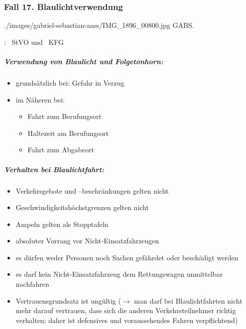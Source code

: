 \subsubsection{Fall 17. Blaulichtverwendung}

{}
{./images/gabriel-sebastian-aass/IMG_1896_00800.jpg}
{}
{GABS.}







: ~StVO und ~KFG

\subparagraph{Verwendung von Blaulicht und Folgetonhorn:}

\begin{itemize}
    \item grundsätzlich bei: Gefahr in Verzug
    \item im Näheren bei:
    \begin{itemize}
        \item Fahrt zum Berufungsort
        \item Haltezeit am Berufungsort
        \item Fahrt zum Abgabeort
    \end{itemize}
\end{itemize}

\subparagraph{Verhalten bei Blaulichtfahrt:}

\begin{itemize}
    \item Verkehrsgebote und --beschränkungen gelten nicht
    \item Geschwindigkeitshöchstgrenzen gelten nicht
    \item Ampeln gelten als Stopptafeln
    \item absoluter Vorrang vor Nicht-Einsatzfahrzeugen
    \item es dürfen weder Personen noch Sachen gefährdet oder beschädigt
    werden
    \item es darf kein Nicht-Einsatzfahrzeug dem Rettungswagen unmittelbar
    nachfahren
    \item Vertrauensgrundsatz ist ungültig (${\rightarrow}$ man darf bei
    Blaulichtfahrten nicht mehr darauf vertrauen, dass sich die anderen
    Verkehrsteilnehmer richtig verhalten; daher ist defensives
    und voraussehendes Fahren verpflichtend)
\end{itemize}


